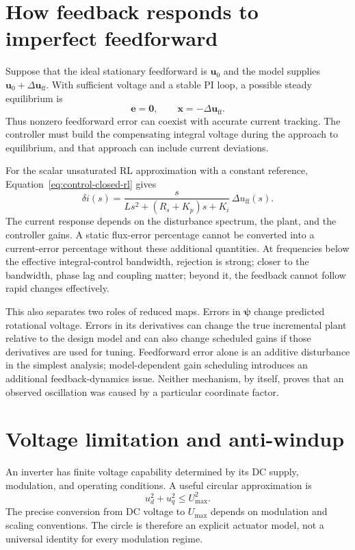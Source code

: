 \section{How feedback responds to imperfect feedforward}

Suppose that the ideal stationary feedforward is $\bm u_0$ and the model supplies $\bm u_0+\Delta\bm u_{\mathrm{ff}}$. With sufficient voltage and a stable PI loop, a possible steady equilibrium is
\begin{equation}
 \bm e=\bm0,
 \qquad \bm x=-\Delta\bm u_{\mathrm{ff}}.
\end{equation}
Thus nonzero feedforward error can coexist with accurate current tracking. The controller must build the compensating integral voltage during the approach to equilibrium, and that approach can include current deviations.

For the scalar unsaturated RL approximation with a constant reference, Equation~\eqref{eq:control-closed-rl} gives
\begin{equation}
 \delta i(s)=
 \frac{s}{Ls^2+(R_s+K_p)s+K_i}\,
                \Delta u_{\mathrm{ff}}(s).
 \label{eq:control-flux-to-current}
\end{equation}
The current response depends on the disturbance spectrum, the plant, and the controller gains. A static flux-error percentage cannot be converted into a current-error percentage without these additional quantities. At frequencies below the effective integral-control bandwidth, rejection is strong; closer to the bandwidth, phase lag and coupling matter; beyond it, the feedback cannot follow rapid changes effectively.

This also separates two roles of reduced maps. Errors in $\bm\psi$ change predicted rotational voltage. Errors in its derivatives can change the true incremental plant relative to the design model and can also change scheduled gains if those derivatives are used for tuning. Feedforward error alone is an additive disturbance in the simplest analysis; model-dependent gain scheduling introduces an additional feedback-dynamics issue. Neither mechanism, by itself, proves that an observed oscillation was caused by a particular coordinate factor.

\section{Voltage limitation and anti-windup}

An inverter has finite voltage capability determined by its DC supply, modulation, and operating conditions. A useful circular approximation is
\begin{equation}
 u_d^2+u_q^2\le U_{\max}^2.
 \label{eq:control-voltage-circle}
\end{equation}
The precise conversion from DC voltage to $U_{\max}$ depends on modulation and scaling conventions. The circle is therefore an explicit actuator model, not a universal identity for every modulation regime.

